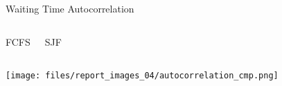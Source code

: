 \documentclass[aspectratio=169,xcolor=dvipsnames]{beamer}
\begin{document}
\begin{frame}{Waiting Time Autocorrelation}
    \vspace{-0.5em}
    \begin{columns}[c]
        \begin{center}
            FCFS
        \end{center}
        \begin{center}
            SJF
        \end{center}
    \end{columns}
    \begin{center}
        \texttt{[image: files/report\_images\_04/autocorrelation\_cmp.png]}
    \end{center}
\end{frame}

\end{document}
